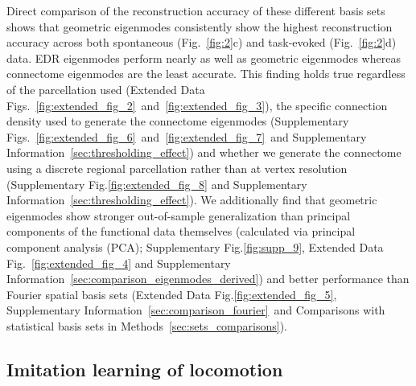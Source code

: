 \documentclass[sn-mathphys-num]{sn-jnl}%
\theoremstyle{thmstyleone}%
\theoremstyle{thmstyletwo}%
\theoremstyle{thmstylethree}%
\begin{document}
Direct comparison of the reconstruction accuracy of these different basis sets shows that geometric eigenmodes consistently show the highest reconstruction accuracy across both spontaneous (Fig.~\ref{fig:2}c) and task-evoked (Fig.~\ref{fig:2}d) data. 
EDR eigenmodes perform nearly as well as geometric eigenmodes whereas connectome eigenmodes are the least accurate. 
This finding holds true regardless of the parcellation used (Extended Data Figs.~\ref{fig:extended_fig_2}~and~\ref{fig:extended_fig_3}), the specific connection density used to generate the connectome eigenmodes (Supplementary Figs.~\ref{fig:extended_fig_6}~and~\ref{fig:extended_fig_7}~and Supplementary Information~\ref{sec:thresholding_effect}) and whether we generate the connectome using a discrete regional parcellation rather than at vertex resolution (Supplementary Fig.\ref{fig:extended_fig_8} and Supplementary Information~\ref{sec:thresholding_effect}). 
We additionally find that geometric eigenmodes show stronger out-of-sample generalization than principal components of the functional data themselves (calculated via principal component analysis (PCA); Supplementary Fig.\ref{fig:supp_9}, Extended Data Fig.~\ref{fig:extended_fig_4} and Supplementary Information~\ref{sec:comparison_eigenmodes_derived}) and better performance than Fourier spatial basis sets (Extended Data Fig.\ref{fig:extended_fig_5}, Supplementary Information~\ref{sec:comparison_fourier}~and Comparisons with statistical basis sets in Methods~\ref{sec:sets_comparisons}).

\subsection{Imitation learning of locomotion}
\end{document}
